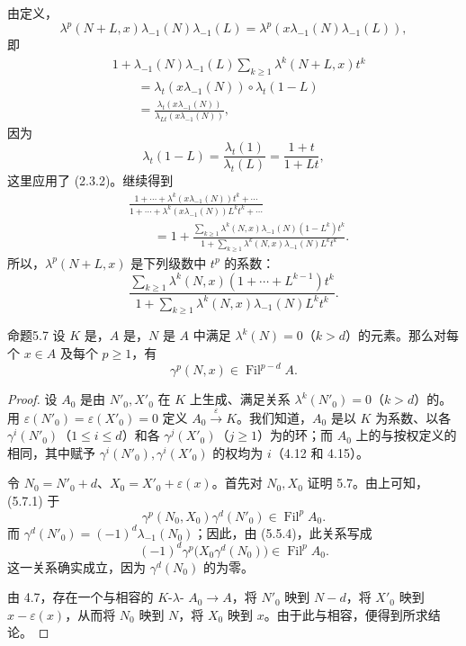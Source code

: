 由定义，
\[
\lambda^p(N+L,x)\lambda_{-1}(N)\lambda_{-1}(L)
=\lambda^p(x\lambda_{-1}(N)\lambda_{-1}(L)),
\]
即
\[
\begin{aligned}
{}&1+\lambda_{-1}(N)\lambda_{-1}(L)\sum_{k\geqslant1}\lambda^k(N+L,x)t^k\\
&\qquad=\lambda_t(x\lambda_{-1}(N))\circ\lambda_t(1-L)\\
&\qquad=\frac{\lambda_t(x\lambda_{-1}(N))}{\lambda_{Lt}(x\lambda_{-1}(N))},
\end{aligned}
\]
因为
\[
\lambda_t(1-L)=\frac{\lambda_t(1)}{\lambda_t(L)}=\frac{1+t}{1+Lt},
\]
这里应用了 (2.3.2)。继续得到
\[
\begin{aligned}
{}&\frac{1+\cdots+\lambda^k(x\lambda_{-1}(N))t^k+\cdots}
{1+\cdots+\lambda^k(x\lambda_{-1}(N))L^kt^k+\cdots}\\
&\qquad=1+
\frac{\displaystyle\sum_{k\geqslant1}\lambda^k(N,x)\lambda_{-1}(N)(1-L^k)t^k}
{\displaystyle1+\sum_{k\geqslant1}\lambda^k(N,x)\lambda_{-1}(N)L^kt^k}.
\end{aligned}
\]
所以，$\lambda^p(N+L,x)$ 是下列级数中 $t^p$ 的系数：
\[
\frac{\displaystyle\sum_{k\geqslant1}\lambda^k(N,x)(1+\cdots+L^{k-1})t^k}
{\displaystyle1+\sum_{k\geqslant1}\lambda^k(N,x)\lambda_{-1}(N)L^kt^k}.
\]

\begin{SGAresult}{命题}{5.7}
设 $K$ 是，$A$ 是，$N$ 是 $A$ 中满足 $\lambda^k(N)=0$（$k>d$）的元素。那么对每个 $x\in A$ 及每个 $p\geqslant1$，有
\[
\gamma^p(N,x)\in\operatorname{Fil}^{p-d}A.
\tag{5.7.1}
\]
\end{SGAresult}
\begin{proof}
设 $A_0$ 是由 $N'_0,X'_0$ 在 $K$ 上生成、满足关系 $\lambda^k(N'_0)=0$（$k>d$）的。用 $\varepsilon(N'_0)=\varepsilon(X'_0)=0$ 定义 $A_0\xrightarrow{\varepsilon}K$。我们知道，$A_0$ 是以 $K$ 为系数、以各 $\gamma^i(N'_0)$（$1\leqslant i\leqslant d$）和各 $\gamma^j(X'_0)$（$j\geqslant1$）为的环；而 $A_0$ 上的与按权定义的相同，其中赋予 $\gamma^i(N'_0),\gamma^i(X'_0)$ 的权均为 $i$（4.12 和 4.15）。

令 $N_0=N'_0+d$、$X_0=X'_0+\varepsilon(x)$。首先对 $N_0,X_0$ 证明 5.7。由上可知，(5.7.1) 于
\[
\gamma^p(N_0,X_0)\gamma^d(N'_0)\in\operatorname{Fil}^pA_0.
\]
而 $\gamma^d(N'_0)=(-1)^d\lambda_{-1}(N_0)$；因此，由 (5.5.4)，此关系写成
\[
(-1)^d\gamma^p\bigl(X_0\gamma^d(N_0)\bigr)\in\operatorname{Fil}^pA_0.
\]
这一关系确实成立，因为 $\gamma^d(N_0)$ 的为零。

由 4.7，存在一个与相容的 $K$-$\lambda$- $A_0\longrightarrow A$，将 $N'_0$ 映到 $N-d$，将 $X'_0$ 映到 $x-\varepsilon(x)$，从而将 $N_0$ 映到 $N$，将 $X_0$
映到 $x$。由于此与相容，便得到所求结论。
\end{proof}
